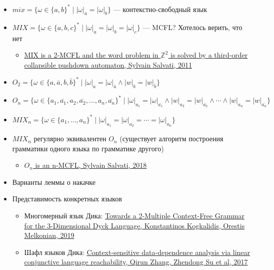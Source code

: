 \begin{itemize}
    \item $mix = \{\omega \in \{a,b\}^* \mid |\omega|_a = |\omega|_b \}$ --- контекстно-свободный язык

    \item $MIX = \{\omega \in \{a,b,c\}^* \mid |\omega|_a = |\omega|_b = |\omega|_c\}$ --- MCFL? Хотелось верить, что нет
    \begin{itemize}
      \item \href{https://hal.inria.fr/inria-00564552/document}{MIX is a 2-MCFL and the word problem in $\mathbb{Z}^2$ is solved by a third-order collapsible pushdown automaton, Sylvain Salvati, 2011}
    \end{itemize}    
    \item $O_2=\{\omega \in \{a,\overline{a},b,\overline{b}\}^* \mid |\omega|_a=|\omega|_{\overline{a}} \wedge |w|_b=|w|_{\overline{b}}\}$
    \item $O_n=\{\omega \in \{a_1,\overline{a_1},a_2,\overline{a_2},\ldots,a_n,\overline{a_n}\}^* \mid |\omega|_{a_1}=|\omega|_{\overline{a_1}} \wedge |w|_{a_2}=|w|_{\overline{a_2}} \wedge \cdots \wedge |w|_{a_n}=|w|_{\overline{a_n}}\}$
    \item $MIX_n = \{\omega \in \{a_1,\ldots,a_n\}^* \mid |\omega|_{a_1} = |\omega|_{a_2} =\cdots = |\omega|_{a_n}\}$    
    \item $MIX_n$ регулярно эквивалентен $O_n$ (существует алгоритм построения грамматики одного языка по грамматике другого)
    \begin{itemize}
      \item \href{https://hal.archives-ouvertes.fr/hal-01771670/document}{$O_n$ is an n-MCFL, Sylvain Salvati, 2018}
    \end{itemize}
  \end{itemize}
  

  \begin{itemize}
    \item Варианты леммы о накачке
    \item Представимость конкретных языков
    \begin{itemize}
      \item Многомерный язык Дика: \href{https://link.springer.com/chapter/10.1007/978-3-662-59620-3_5}{Towards a 2-Multiple Context-Free Grammar for the 3-Dimensional Dyck Language, Konstantinos Kogkalidis, Orestis Melkonian, 2019}
      \item Шафл языков Дика: \href{https://dl.acm.org/doi/10.1145/3093333.3009848}{Context-sensitive data-dependence analysis via linear conjunctive language reachability, Qirun Zhang, Zhendong Su et al, 2017}
    \end{itemize}
  \end{itemize}  

